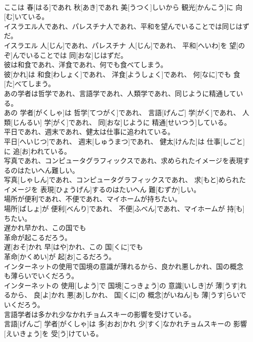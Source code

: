\documentclass[8pt]{extreport}
\begin{document}
\begin{CJK}{UTF8}{min}
\\	ここは 春[はる]であれ 秋[あき]であれ 美[うつく]しいから 観光[かんこう]に 向[む]いている。
\\	イスラエル人であれ、パレスチナ人であれ、平和を望んでいることでは同じはずだ。	
\\	イスラエル 人[じん]であれ、パレスチナ 人[じん]であれ、 平和[へいわ]を 望[のぞ]んでいることでは 同[おな]じはずだ。
\\	彼は和食であれ、洋食であれ、何でも食べてしまう。	
\\	彼[かれ]は 和食[わしょく]であれ、 洋食[ようしょく]であれ、 何[なに]でも 食[た]べてしまう。
\\	あの学者は哲学であれ、言語学であれ、人類学であれ、同じように精通している。	
\\	あの 学者[がくしゃ]は 哲学[てつがく]であれ、 言語[げんご] 学[がく]であれ、 人類[じんるい] 学[がく]であれ、 同[おな]じように 精通[せいつう]している。
\\	平日であれ、週末であれ、健太は仕事に追われている。	
\\	平日[へいじつ]であれ、 週末[しゅうまつ]であれ、 健太[けんた]は 仕事[しごと]に 追[お]われている。
\\	写真であれ、コンピュータグラフィックスであれ、求められたイメージを表現するのはたいへん難しい。	
\\	写真[しゃしん]であれ、コンピュータグラフィックスであれ、 求[もと]められたイメージを 表現[ひょうげん]するのはたいへん 難[むずか]しい。
\\	場所が便利であれ、不便であれ、マイホームが持ちたい。	
\\	場所[ばしょ]が 便利[べんり]であれ、 不便[ふべん]であれ、マイホームが 持[も]ちたい。
\\	遅かれ早かれ、この国でも
\\	革命が起こるだろう。	
\\	遅[おそ]かれ 早[はや]かれ、この 国[くに]でも 
\\	革命[かくめい]が 起[お]こるだろう。
\\	インターネットの使用で国境の意識が薄れるから、良かれ悪しかれ、国の概念も薄らいでいくだろう。	
\\	インターネットの 使用[しよう]で 国境[こっきょう]の 意識[いしき]が 薄[うす]れるから、 良[よ]かれ 悪[あ]しかれ、 国[くに]の 概念[がいねん]も 薄[うす]らいでいくだろう。
\\	言語学者は多かれ少なかれチョムスキーの影響を受けている。	
\\	言語[げんご] 学者[がくしゃ]は 多[おお]かれ 少[すく]なかれチョムスキーの 影響[えいきょう]を 受[う]けている。

\end{CJK}
\end{document}
